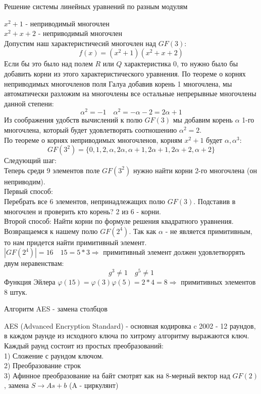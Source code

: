 \begin{title}
  Решение системы линейных уравнений по разным модулям
\end{title}

$x^2 + 1$ - неприводимый многочлен\\
$x^2 + x + 2$ - неприводимый многочлен\\
Допустим наш характеристичесий многочлен над $GF(3)$:
\[f(x) = (x^2 + 1)(x^2 + x + 2)\]
Если бы это было над полем $R$ или  $Q$ характеристика 0, то нужно было бы
добавить корни из этого
характеристического уравнения. По теореме о корнях неприводимых многочленов поля
Галуа добавив корень 1
многочлена, мы автоматически разложим на многочлены все остальные непрерывные
многочлены данной степени:
\[\alpha^2 = -1 \quad \alpha^2 = -\alpha - 2 = 2 \alpha + 1\]
Из соображения удобств вычислений к полю $GF(3)$ мы добавим корень $\alpha$ 1-го многочлена, который будет
удовлетворять соотношению $\alpha^2 = 2$.\\
По теореме о корнях неприводимых многочленов, корням $x^2 + 1$ будет $\alpha,
\alpha^3$:
\[GF(3^2) = \{0, 1, 2, \alpha, 2\alpha, \alpha + 1, 2\alpha + 1, 2\alpha + 2,
\alpha + 2\}\]
Следующий шаг:\\
Теперь среди 9 элементов поле $GF(3^2)$ нужно найти корни 2-го многочлена
(он неприводим).\\
Первый способ:\\
Перебрать все 6 элементов, непринадлежащих полю $GF(3)$. Подставив в многочлен
и проверить кто корень?
2 из 6 - корни.\\
Второй способ:
Найти корни по формуле решения квадратного уравнения.\\

Возвращаемся к нашему полю $GF(2^4)$. Так как $\alpha$ - не является
примитивным, то нам придется найти
примитивный элемент.\\
$|GF(2^4)| = 16 \quad 15 = 5 * 3 \Rightarrow$ примитивный элемент должен
удовлетворрять двум неравенствам:
\[g^3 \neq 1 \quad g^5 \neq 1\]
Функция Эйлера $\varphi(15) = \varphi(3)\varphi(5) = 2 * 4 = 8 \Rightarrow$
примитивных элементов 8 штук.

\begin{title}
  Алгоритм AES - замена столбцов
\end{title}

AES (Advanced Encryption Standard) - основная кодировка c 2002 - 12 раундов, в
каждом раунде из исходного
ключа по хитрому алгоритму выражаются ключ. Каждый раунд состоит из простых
преобразований:\\
1) Сложение с раундом ключом.\\
2) Преобразование строк\\
3) Афинное преобразование на байт смотрят как на 8-мерный вектор над $GF(2)$,
замена
$S \rightarrow As + b$ (A - циркулянт)